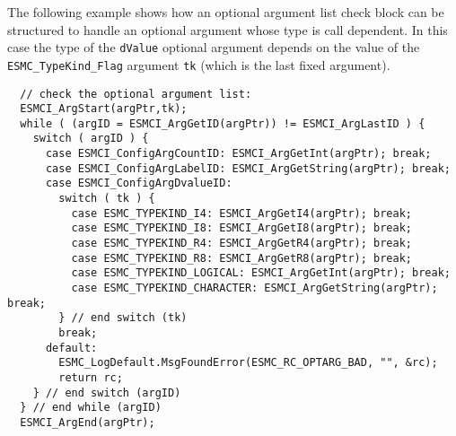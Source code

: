\noindent
The following example shows how an optional argument list check block can be
structured to handle an optional argument whose type is call dependent. In this
case the type of the \texttt{dValue} optional argument depends on the value of the
\texttt{ESMC\_TypeKind\_Flag} argument \texttt{tk} (which is the last fixed argument).
\begin{verbatim}
  // check the optional argument list:
  ESMCI_ArgStart(argPtr,tk);
  while ( (argID = ESMCI_ArgGetID(argPtr)) != ESMCI_ArgLastID ) {
    switch ( argID ) {
      case ESMCI_ConfigArgCountID: ESMCI_ArgGetInt(argPtr); break;
      case ESMCI_ConfigArgLabelID: ESMCI_ArgGetString(argPtr); break;
      case ESMCI_ConfigArgDvalueID:
        switch ( tk ) {
          case ESMC_TYPEKIND_I4: ESMCI_ArgGetI4(argPtr); break;
          case ESMC_TYPEKIND_I8: ESMCI_ArgGetI8(argPtr); break;
          case ESMC_TYPEKIND_R4: ESMCI_ArgGetR4(argPtr); break;
          case ESMC_TYPEKIND_R8: ESMCI_ArgGetR8(argPtr); break;
          case ESMC_TYPEKIND_LOGICAL: ESMCI_ArgGetInt(argPtr); break;
          case ESMC_TYPEKIND_CHARACTER: ESMCI_ArgGetString(argPtr); break;
        } // end switch (tk)
        break;
      default:
        ESMC_LogDefault.MsgFoundError(ESMC_RC_OPTARG_BAD, "", &rc);
        return rc;
    } // end switch (argID)
  } // end while (argID)
  ESMCI_ArgEnd(argPtr);
\end{verbatim}



